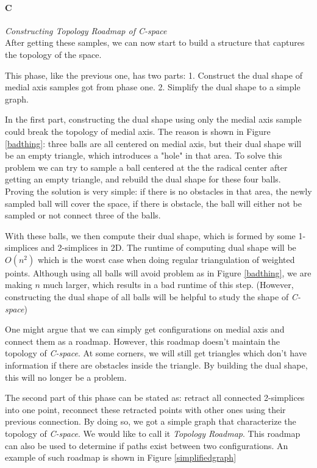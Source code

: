 \documentclass[11pt]{article}
\begin{document}

\paragraph{C} \emph{Constructing Topology Roadmap of C-space} \hfill \\
\indent After getting these samples, we can now start to build a structure that captures the topology of the space. 

\indent This phase, like the previous one, has two parts: 1. Construct the dual shape of medial axis samples got from phase one. 2. Simplify the dual shape to a simple graph.

\indent In the first part, constructing the dual shape using only the medial axis sample could break the topology of medial axis. The reason is shown in Figure \ref{badthing}: three balls are all centered on medial axis, but their dual shape will be an empty triangle, which introduces a "hole" in that area. To solve this problem we can try to sample a ball centered at the the radical center after getting an empty triangle, and rebuild the dual shape for these four balls. \cite{radical center} Proving the solution is very simple: if there is no obstacles in that area, the newly sampled ball will cover the space, if there is obstacle, the ball will either not be sampled or not connect three of the balls.

\indent With these balls, we then compute their dual shape, which is formed by some 1-simplices and 2-simplices in 2D. The runtime of computing dual shape will be $O(n^2)$ which is the worst case when doing regular triangulation of weighted points. Although using all balls will avoid problem as in Figure \ref{badthing}, we are making $n$ much larger, which results in a bad runtime of this step. (However, constructing the dual shape of all balls will be helpful to study the shape of \emph{C-space})

\indent One might argue that we can simply get configurations on medial axis and connect them as a roadmap. However, this roadmap doesn't maintain the topology of \emph{C-space}. At some corners, we will still get triangles which don't have information if there are obstacles inside the triangle. By building the dual shape, this will no longer be a problem.

\indent The second part of this phase can be stated as: retract all connected 2-simplices into one point, reconnect these retracted points with other ones using their previous connection. By doing so, we got a simple graph that characterize the topology of \emph{C-space}. We would like to call it \emph{Topology Roadmap}. This roadmap can also be used to determine if paths exist between two configurations. An example of such roadmap is shown in Figure \ref{simplifiedgraph}
\end{document}
